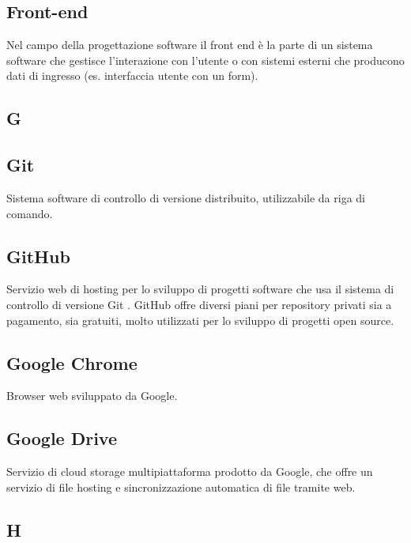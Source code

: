 \subsection{Front-end}
Nel campo della progettazione software il front end è la parte di un sistema software che gestisce l'interazione con l'utente o con sistemi esterni che producono dati di ingresso (es. interfaccia utente con un form).

\newpage

\begin{center}
\Huge\section{\uppercase{G}}
\end{center}

\subsection{Git}
Sistema software di controllo di versione distribuito, utilizzabile da riga di comando.

\subsection{GitHub}
Servizio web di hosting per lo sviluppo di progetti software che usa il sistema di controllo
di versione Git . GitHub offre diversi piani per repository privati sia a pagamento, sia
gratuiti, molto utilizzati per lo sviluppo di progetti open source.

\subsection{Google Chrome}
Browser web sviluppato da Google.

\subsection{Google Drive}
Servizio di cloud storage multipiattaforma prodotto da Google, che offre un servizio di file hosting e
sincronizzazione automatica di file tramite web.

\newpage

\begin{center}
\Huge\section{\uppercase{H}}
\end{center}


